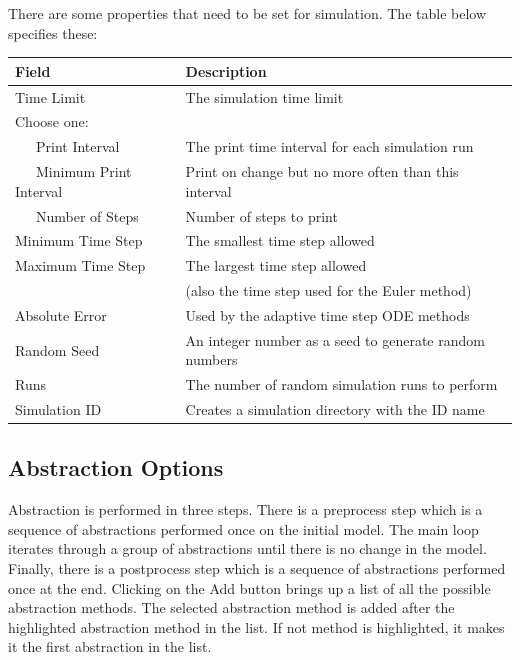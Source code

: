 \documentclass[titlepage,11pt]{article}
\begin{document}
There are some properties that need to be set for simulation.
The table below specifies these:

\begin{center}
\begin{tabular}{|l|l|}
\hline
Field             & Description \\ \hline \hline
Time Limit        & The simulation time limit \\ \hline
Choose one:    &  \\ \hline
~~~Print Interval    & The print time interval for each simulation run \\ \hline 
~~~Minimum Print Interval    & Print on change but no more often than this interval \\ \hline  
~~~Number of Steps    & Number of steps to print \\ \hline  
Minimum Time Step & The smallest time step allowed \\ \hline
Maximum Time Step & The largest time step allowed \\ 
      ~           & (also the time step used for the Euler method) \\ \hline
Absolute Error    & Used by the adaptive time step ODE methods \\ \hline
Random Seed       & An integer number as a seed to generate random numbers \\ \hline
Runs              & The number of random simulation runs to perform \\ \hline
Simulation ID     & Creates a simulation directory with the ID name \\ \hline
\end{tabular}
\end{center}

\subsection{\label{absOptions}Abstraction Options}

\noindent
Abstraction is performed in three steps.  There is a preprocess step which is a sequence of abstractions performed once on the initial model.  The main loop iterates through a group of abstractions until there is no change in the model.  Finally, there is a postprocess step which is a sequence of abstractions performed once at the end.  Clicking on the Add button brings up a list of all the possible abstraction methods.  The selected abstraction method is added after the highlighted abstraction method in the list.  If not method is highlighted, it makes it the first abstraction in the list.
\end{document}
